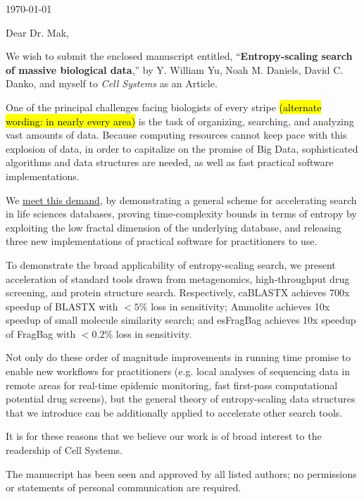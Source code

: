 \documentclass{article}
\begin{document}
\hspace*{0.5\linewidth}

\today

\bigskip

Dear Dr. Mak,

We wish to submit the enclosed manuscript entitled,
``\textbf{Entropy-scaling search of massive biological data},''
by Y. William Yu, Noah M. Daniels, David C. Danko, and myself
to \textit{Cell Systems} as an Article.

One of the principal challenges facing biologists of every stripe \hl{(alternate wording: in nearly every area)} is the task of organizing, searching, and analyzing vast amounts of data.
Because computing resources cannot keep pace with this explosion of data, in order to capitalize on the promise of Big Data, sophisticated algorithms and data structures are needed, as well as fast practical software implementations.

We \underline{meet this demand}, by demonstrating a general scheme for accelerating search in life sciences databases, proving time-complexity bounds in terms of entropy by exploiting the low fractal dimension of the underlying database, and releasing three new implementations of practical software for practitioners to use.

To demonstrate the broad applicability of entropy-scaling search, we present acceleration of standard tools drawn from metagenomics, high-throughput drug screening, and protein structure search.
Respectively, caBLASTX achieves 700x speedup of BLASTX with $<5\%$ loss in sensitivity; Ammolite achieves 10x speedup of small molecule similarity search; and esFragBag achieves 10x speedup of FragBag with $<0.2\%$ loss in sensitivity.

Not only do these order of magnitude improvements in running time promise to enable new workflows for practitioners (e.g. local analyses of sequencing data in remote areas for real-time epidemic monitoring, fast first-pass computational potential drug screens), but the general theory of entropy-scaling data structures that we introduce can be additionally applied to accelerate other search tools.

It is for these reasons that we believe our work is of broad interest to the readership of Cell Systems.

The manuscript has been seen and approved by all listed authors; no permissions or statements of personal communication are required.
\end{document}

